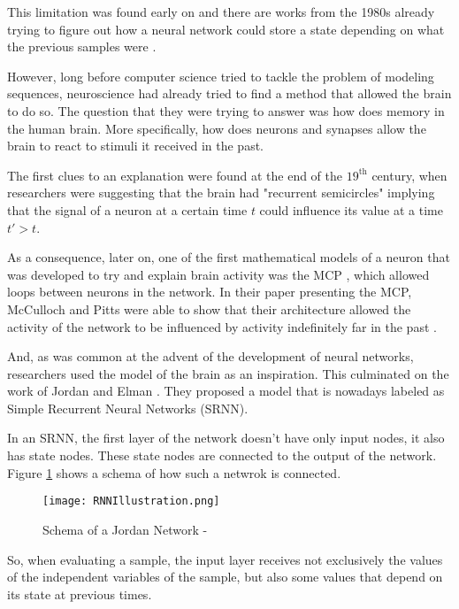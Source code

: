 This limitation was found early on and there are works from the 1980s already trying to figure out how a neural network could store a state depending on what the previous samples were \cite{jordan1986serial}.

However, long before computer science tried to tackle the problem of modeling sequences, neuroscience had already tried to find a method that allowed the brain to do so.
The question that they were trying to answer was how does memory in the human brain.
More specifically, how does neurons and synapses allow the brain to react to stimuli it received in the past.

The first clues to an explanation were found at the end of the $19^{\text{th}}$ century, when researchers were suggesting that the brain had "recurrent semicircles" \cite{espinosa2025importance} implying that the signal of a neuron at a certain time $t$ could influence its value at a time $t' > t$.

As a consequence, later on, one of the first mathematical models of a neuron that was developed to try and explain brain activity was the MCP \cite{mcculloch1943logical}, which allowed loops between neurons in the network.
In their paper presenting the MCP, McCulloch and Pitts were able to show that their architecture allowed the activity of the network to be influenced by activity indefinitely far in the past \cite{mcculloch1943logical}.

And, as was common at the advent of the development of neural networks, researchers used the model of the brain as an inspiration.
This culminated on the work of Jordan \cite{jordan1986serial} and Elman \cite{elman1990finding}.
They proposed a model that is nowadays labeled as Simple Recurrent Neural Networks (SRNN).

In an SRNN, the first layer of the network doesn't have only input nodes, it also has state nodes.
These state nodes are connected to the output of the network.
Figure \ref{fig:RNNIllustration} shows a schema of how such a netwrok is connected.

\begin{figure}
    \begin{center}
        \texttt{[image: RNNIllustration.png]}
        \caption[Schema of a Jordan Network]{Schema of a Jordan Network - \cite{elman1990finding}}
        \label{fig:RNNIllustration}
    \end{center}
\end{figure}

So, when evaluating a sample, the input layer receives not exclusively the values of the independent variables of the sample, but also some values that depend on its state at previous times.

